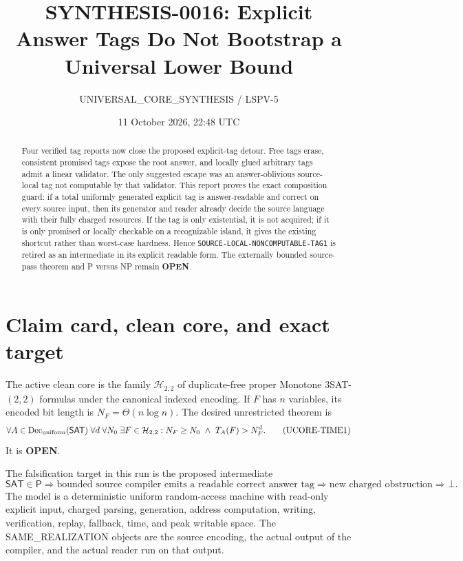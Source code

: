 \documentclass[11pt]{article}
\title{SYNTHESIS-0016: Explicit Answer Tags Do Not Bootstrap a Universal Lower Bound}
\author{UNIVERSAL\_CORE\_SYNTHESIS / LSPV-5}
\date{11 October 2026, 22:48 UTC}
\newcommand{\SAT}{\mathsf{SAT}}
\newcommand{\Pclass}{\mathsf P}
\newcommand{\OPEN}{\textbf{OPEN}}
\begin{document}
\maketitle

\begin{abstract}
Four verified tag reports now close the proposed explicit-tag detour.  Free
tags erase, consistent promised tags expose the root answer, and locally
glued arbitrary tags admit a linear validator.  The only suggested escape was
an answer-oblivious source-local tag not computable by that validator.  This
report proves the exact composition guard: if a total uniformly generated
explicit tag is answer-readable and correct on every source input, then its
generator and reader already decide the source language with their fully
charged resources.  If the tag is only existential, it is not acquired; if it
is only promised or locally checkable on a recognizable island, it gives the
existing shortcut rather than worst-case hardness.  Hence
\texttt{SOURCE-LOCAL-NONCOMPUTABLE-TAG1} is retired as an intermediate in its
explicit readable form.  The externally bounded source-pass theorem and P
versus NP remain \OPEN.
\end{abstract}

\section{Claim card, clean core, and exact target}

The active clean core is the family $\mathcal H_{2,2}$ of duplicate-free
proper Monotone $3$SAT-$(2,2)$ formulas under the canonical indexed encoding.
If $F$ has $n$ variables, its encoded bit length is
$N_F=\Theta(n\log n)$.  The desired unrestricted theorem is
\[
 \forall A\in\operatorname{Dec}_{\rm uniform}(\SAT)\;
 \forall d\;\forall N_0\;\exists F\in\mathcal H_{2,2}:
 N_F\ge N_0\ \land\ T_A(F)>N_F^d .                 \tag{UCORE-TIME1}
\]
It is \OPEN.

The falsification target in this run is the proposed intermediate
\[
 \SAT\in\Pclass
 \Longrightarrow
 \boxed{\text{bounded source compiler emits a readable correct answer tag}}
 \Longrightarrow
 \boxed{\text{new charged obstruction}}
 \Longrightarrow\bot .                              \tag{1}
\]
The model is a deterministic uniform random-access machine with read-only
explicit input, charged parsing, generation, address computation, writing,
verification, replay, fallback, time, and peak writable space.  The
SAME\_REALIZATION objects are the source encoding, the actual output of the
compiler, and the actual reader run on that output.
\end{document}
